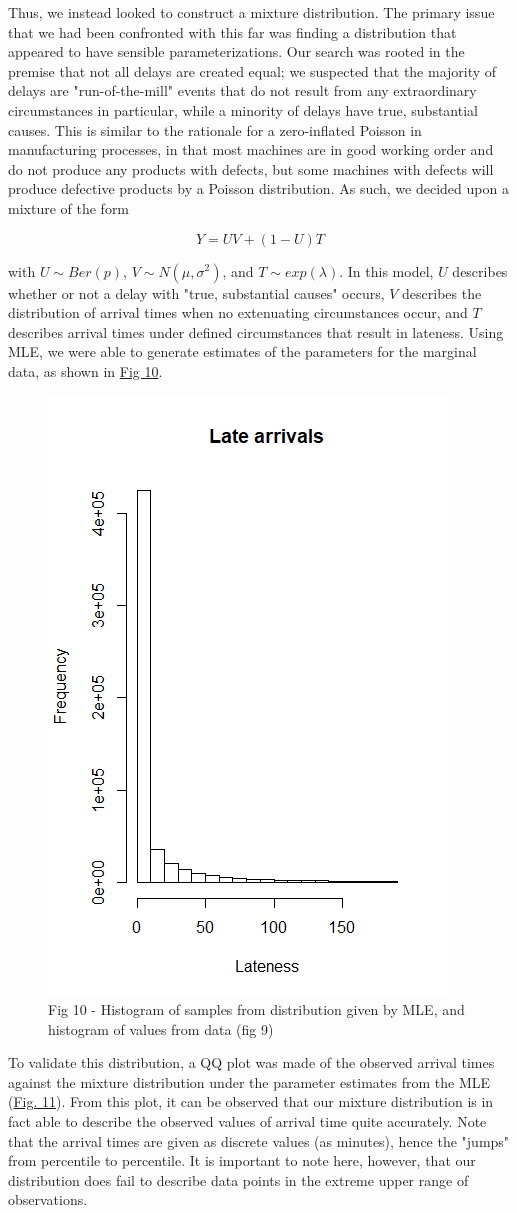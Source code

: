 \documentclass[12pt, a4paper]{book}
\newcommand\tab[1][1cm]{\hspace*{#1}}
\begin{document}
	\tab Thus, we instead looked to construct a mixture distribution. The primary issue that we had been confronted with this far was finding a distribution that appeared to have sensible parameterizations.  Our search was rooted in the premise that not all delays are created equal;  we suspected that the majority of delays are "run-of-the-mill" events that do not result from any extraordinary circumstances in particular, while a minority of delays have true, substantial causes. This is similar to the rationale for a zero-inflated Poisson in manufacturing processes, in that most machines are in good working order and do not produce any products with defects, but some machines with defects will produce defective products by a Poisson distribution. As such, we decided upon a mixture of the form \begin{center}$$Y = UV + (1-U)T$$\end{center} with $U\sim Ber(p)$, $V\sim N(\mu,\sigma^2)$, and $T\sim exp(\lambda)$. In this model, $U$ describes whether or not a delay with "true, substantial causes" occurs, $V$ describes the distribution of arrival times when no extenuating circumstances occur, and $T$ describes arrival times under defined circumstances that result in lateness. Using MLE, we were able to generate estimates of the parameters for the marginal data, as shown in \underline{Fig 10}.
			\begin{figure}
			\centering
	 		\includegraphics[width = .45 \textwidth]{../figures/LateArrivalsHistogram}
	 		\caption{Fig 10 - Histogram of samples from distribution given by MLE, and histogram of values from data (fig 9)}
	 		\end{figure}
	\tab To validate this distribution, a QQ plot was made of the observed arrival times against the mixture distribution under the parameter estimates from the MLE (\underline{Fig. 11}). From this plot, it can be observed that our mixture distribution is in fact able to describe the observed values of arrival time quite accurately. Note that the arrival times are given as discrete values (as minutes), hence the "jumps" from percentile to percentile. It is important to note here, however, that our distribution does fail to describe data points in the extreme upper range of observations. 
\end{document}
